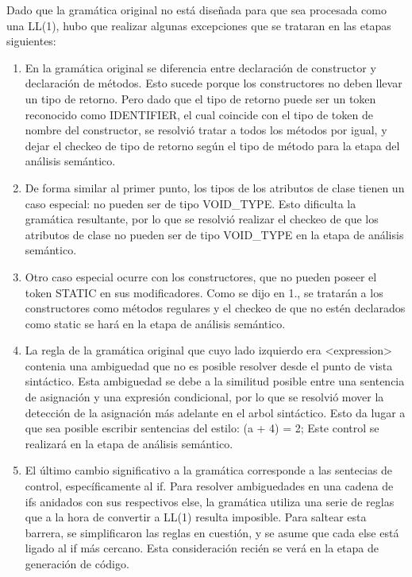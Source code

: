 Dado que la gramática original no está diseñada para que sea procesada
como una LL(1), hubo que realizar algunas excepciones que se trataran
en las etapas siguientes:
  \begin{enumerate}
\item%
En la gramática original se diferencia entre declaración de
constructor y declaración de métodos. Esto sucede porque los
constructores no deben llevar un tipo de retorno. Pero dado que el
tipo de retorno puede ser un token reconocido como IDENTIFIER, el cual
coincide con el tipo de token de nombre del constructor, se resolvió
tratar a todos los métodos por igual, y dejar el checkeo de tipo de
retorno según el tipo de método para la etapa del análisis
semántico.

\item%
De forma similar al primer punto, los tipos de los atributos de clase tienen
un caso especial: no pueden ser de tipo VOID\_{}TYPE. Esto dificulta la
gramática resultante, por lo que se resolvió realizar el checkeo de
que los atributos de clase no pueden ser de tipo VOID\_{}TYPE en la etapa
de análisis semántico.

\item%
Otro caso especial ocurre con los constructores, que no pueden
poseer el token STATIC en sus modificadores. Como se dijo en 1., se
tratarán a los constructores como métodos regulares y el checkeo de
que no estén declarados como static se hará en la etapa de análisis
semántico.

\item%
La regla de la gramática original que cuyo lado izquierdo era
\textless{}expression\textgreater{} contenia una ambiguedad que no es posible resolver desde
el punto de vista sintáctico. Esta ambiguedad se debe a la similitud
posible entre una sentencia de asignación y una expresión condicional,
por lo que se resolvió mover la detección de la asignación más
adelante en el arbol sintáctico. Esto da lugar a que sea posible
escribir sentencias del estilo: (a + 4) = 2;
   Este control se realizará en la etapa de análisis semántico.

\item%
El último cambio significativo a la gramática corresponde a las
sentecias de control, específicamente al if. Para resolver
ambiguedades en una cadena de ifs anidados con sus respectivos else,
la gramática utiliza una serie de reglas que a la hora de convertir a
LL(1) resulta imposible. Para saltear esta barrera, se simplificaron
las reglas en cuestión, y se asume que cada else está ligado al if más
cercano.
Esta consideración recién se verá en la etapa de generación de
código.

\end{enumerate}
